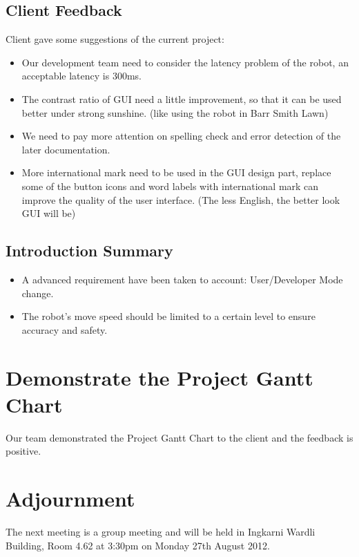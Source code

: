 \documentclass[11pt, a4paper]{article}
\begin{document}
\subsection{Client Feedback}
Client gave some suggestions of the current project:
\begin{itemize}
\item Our development team need to consider the latency problem of the robot, an acceptable
latency is 300ms. 
\item The contrast ratio of GUI need a little improvement, so that it can be used better under strong sunshine. (like using the robot in Barr Smith Lawn)
\item We need to pay more attention on spelling check and error detection of the later documentation. 
\item More international mark need to be used in the GUI design part, replace some of the button
icons and word labels with international mark can improve the quality of the user interface. (The less English, the better look GUI will be)
\end{itemize}

\subsection{Introduction Summary}
\begin{itemize}
\item A advanced requirement have been taken to account: User/Developer Mode change. 
\item The robot's move speed should be limited to a certain level to ensure accuracy and safety. 
\end{itemize}


\section{Demonstrate the Project Gantt Chart}
Our team demonstrated the Project Gantt Chart to the client and the feedback is positive.

\section{Adjournment}
The next meeting is a group meeting and will be held in Ingkarni Wardli Building, Room 4.62 at 3:30pm on Monday 27th August 2012.

\vspace*{10pt}
\end{document}
